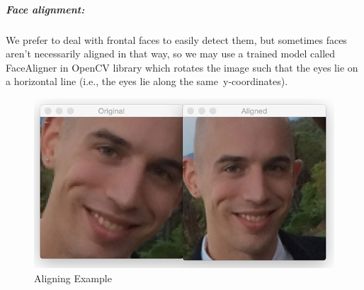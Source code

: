 \subparagraph{Face alignment:}
We prefer to deal with frontal faces to easily detect them, but sometimes faces aren’t necessarily aligned in that way, so we may use a trained model called FaceAligner in OpenCV library which rotates the image such that the eyes lie on a horizontal line (i.e., the eyes lie along the same y-coordinates).\newline
\begin{figure}[H]
	\centering
	\includegraphics[width=\linewidth]{images/Aligning.jpg}
	\caption{Aligning Example}
\end{figure}
